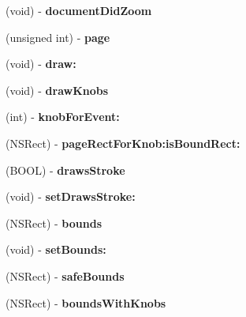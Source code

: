\begin{DoxyCompactItemize}
(void) -\/ {\bfseries document\+Did\+Zoom}
\item 
\mbox{\label{interface_f_p_graphic_af10f46d0839eb38e19656fccc39b66f9}} 
(unsigned int) -\/ {\bfseries page}
\item 
\mbox{\label{interface_f_p_graphic_a80c0736e83db331ff81a2310301953f6}} 
(void) -\/ {\bfseries draw\+:}
\item 
\mbox{\label{interface_f_p_graphic_a4de0f77bae713caf576a12d816f3bcdb}} 
(void) -\/ {\bfseries draw\+Knobs}
\item 
\mbox{\label{interface_f_p_graphic_a2c4fea03badbcc4f8f94868034ca4744}} 
(int) -\/ {\bfseries knob\+For\+Event\+:}
\item 
\mbox{\label{interface_f_p_graphic_abb3bae41a75c8dadbd02847d804d9b07}} 
(N\+S\+Rect) -\/ {\bfseries page\+Rect\+For\+Knob\+:is\+Bound\+Rect\+:}
\item 
\mbox{\label{interface_f_p_graphic_a029214a67437c5d55ef19315a45effd1}} 
(B\+O\+OL) -\/ {\bfseries draws\+Stroke}
\item 
\mbox{\label{interface_f_p_graphic_aaa53379be937b53375122f17bb309ecc}} 
(void) -\/ {\bfseries set\+Draws\+Stroke\+:}
\item 
\mbox{\label{interface_f_p_graphic_aa7d654fb212bd4fb90ea7d5b817617e7}} 
(N\+S\+Rect) -\/ {\bfseries bounds}
\item 
\mbox{\label{interface_f_p_graphic_a4fbcd4158effdf28c547eb0ebd7eee05}} 
(void) -\/ {\bfseries set\+Bounds\+:}
\item 
\mbox{\label{interface_f_p_graphic_a8240b9e7435bab5400c32cc133a77d55}} 
(N\+S\+Rect) -\/ {\bfseries safe\+Bounds}
\item 
\mbox{\label{interface_f_p_graphic_a698566c27866c0218c9f5ae9e1c349f9}} 
(N\+S\+Rect) -\/ {\bfseries bounds\+With\+Knobs}
\item 

\end{DoxyCompactItemize}
